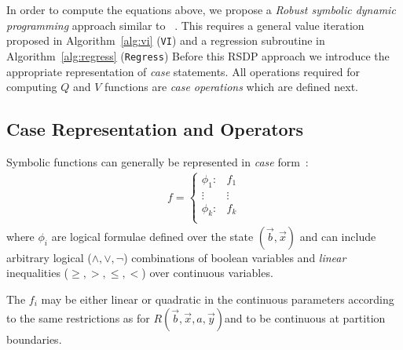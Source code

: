 
In order to compute the equations above, we propose a \emph{Robust symbolic dynamic programming} approach similar to ~\cite{sanner_uai11}.  This requires a general value iteration proposed in Algorithm~\ref{alg:vi} (\texttt{VI})
and a regression subroutine in Algorithm~\ref{alg:regress}
(\texttt{Regress}) %
Before this RSDP approach we introduce the appropriate representation of \emph{case} statements. All operations required for computing $Q$ and $V$ functions are \emph{case operations} which are defined next. 

\subsection{Case Representation and Operators}

Symbolic functions can generally be represented in \emph{case} form~\cite{fomdp}:
{%
\begin{align}
f = 
\begin{cases}
  \phi_1: & f_1 \\ 
 \vdots&\vdots\\ 
  \phi_k: & f_k \\ 
\end{cases} \label{eq:case}
\end{align}
}
where $\phi_i$ are logical formulae defined over the state
$(\vec{b},\vec{x})$ and can include arbitrary logical ($\land,\lor,\neg$)
combinations of boolean variables and \emph{linear} inequalities ($\geq,>,\leq,<$) 
over continuous variables.  

The $f_i$ may be either linear or quadratic in the continuous parameters according to the same restrictions as for 
$R(\vec{b},\vec{x},a,\vec{y})$and to be continuous at partition boundaries. 


